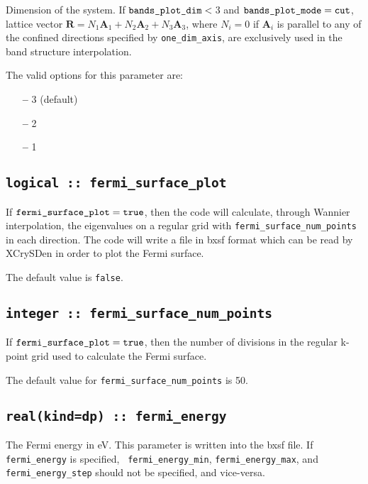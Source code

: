 Dimension of the system.
If $\verb#bands_plot_dim#<\:$3 and $\verb#bands_plot_mode#=\verb#cut#$,
lattice vector $\mathbf{R}=N_1 \mathbf{A}_{1} + N_2 \mathbf{A}_{2} + N_3 \mathbf{A}_3$,
where $N_i=0$ if $\mathbf{A}_i$ is parallel to any of the
confined directions specified by \verb#one_dim_axis#,
are exclusively used in the band structure interpolation.

The valid options for this parameter are:
\begin{itemize}
\item[{\bf --}] 3 (default)
\item[{\bf --}] 2
\item[{\bf --}] 1
\end{itemize}


\subsection[fermi\_surface\_plot]{\tt logical :: fermi\_surface\_plot}

If $\verb#fermi_surface_plot#=\verb#true#$, then the code will calculate,
through Wannier interpolation, the
eigenvalues on a regular grid with \verb#fermi_surface_num_points# in
each direction. The code will write a file in bxsf format which can be
read by XCrySDen in order to plot the Fermi surface.

The default value is \verb#false#.


\subsection[fermi\_surface\_num\_points]{\tt integer :: fermi\_surface\_num\_points}

If $\verb#fermi_surface_plot#=\verb#true#$, then the number of divisions in
the regular k-point grid used to calculate the Fermi surface.

The default value for \verb#fermi_surface_num_points# is 50.


\subsection[fermi\_energy]{\tt real(kind=dp) :: fermi\_energy}
The Fermi energy in eV. This parameter is written into the bxsf file.
If {\tt fermi\_energy} is specified, {\tt
    fermi\_energy\_min}, {\tt fermi\_energy\_max}, and {\tt
    fermi\_energy\_step} should not be specified, and vice-versa.


